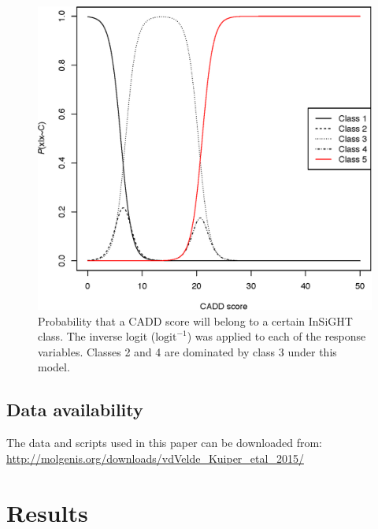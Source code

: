\begin{figure}[htb]
  \centering
  \includegraphics[width=1.00\linewidth]{img/caddmmr_regression}
  \caption[Probability that a CADD score belongs to a class]{
      \label{fig:caddmmr_regression} Probability that a CADD score will belong to a certain InSiGHT class.
      The inverse logit ($\text{logit}^{-1}$) was applied to each of the response variables.
      Classes 2 and 4 are dominated by class 3 under this model.
  }
\end{figure}

\subsection{Data availability}
The data and scripts used in this paper can be downloaded from: \url{http://molgenis.org/downloads/vdVelde_Kuiper_etal_2015/}

\section{Results}

